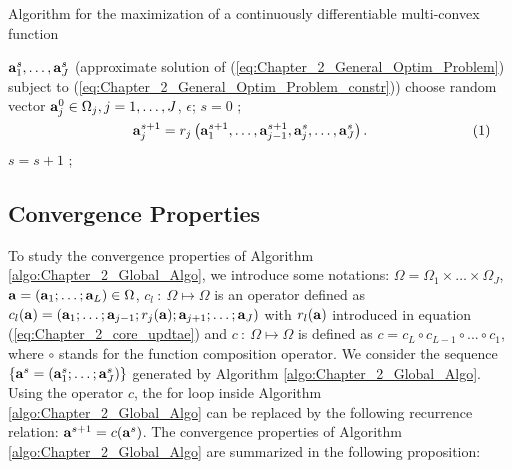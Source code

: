 \documentclass[
]{jss}
\begin{document}
\begin{algorithm}[!ht]
    \caption{Algorithm for the maximization of a continuously differentiable multi-convex function}
    \begin{algorithmic}[1]
         {$\mathbf{a}_1^s, \ldots, \mathbf{a}_J^s$ (approximate solution of (\ref{eq:Chapter_2_General_Optim_Problem}) subject to (\ref{eq:Chapter_2_General_Optim_Problem_constr}))}
         {choose random vector $\mathbf{a}_j^0\in\Omega_j, j =1, \ldots, J$, $\epsilon$;}
        \STATE$s = 0$ ;
        \REPEAT
        \STATE \hspace{-2cm}$\vcenter{\begin{equation}
            \ma a_j^{s+1} = r_j\left( \ma a_1^{s+1}, \ldots, \ma a_{j-1}^{s+1}, \ma a_j^{s}, \ldots, \ma a_J^{s}\right).
        \end{equation}}$
        \ENDFOR
        \STATE$s = s + 1$ ;
    \end{algorithmic}
    \label{algo:Chapter_2_Global_Algo}
\end{algorithm}

\hypertarget{convergence-properties}{%
\subsection{Convergence Properties}\label{convergence-properties}}

To study the convergence properties of Algorithm\\
\ref{algo:Chapter_2_Global_Algo}, we introduce some notations:
\(\Omega = \Omega_1 \times \ldots \times \Omega_J\),
\(\mathbf{a} = \left(\mathbf{a}_1; \ldots;\mathbf{a}_L\right) \in \Omega\),
\(c_l~:~\Omega\mapsto\Omega\) is an operator defined as
\(c_l(\mathbf{a}) = \left(\mathbf{a}_1; \ldots; \mathbf{a}_{j-1} ; r_j(\mathbf{a}) ; \mathbf{a}_{j+1} ; \ldots; \mathbf{a}_J\right)\)
with \(r_l(\mathbf{a})\) introduced in equation
(\ref{eq:Chapter_2_core_updtae}) and \(c~:~\Omega\mapsto\Omega\) is
defined as \(c = c_L\circ c_{L-1}\circ ... \circ c_1\), where \(\circ\)
stands for the function composition operator. We consider the sequence
\(\left\lbrace \mathbf{a}^s = \left(\mathbf{a}_1^{s}; \ldots; \mathbf{a}_J^{s} \right) \right\rbrace\)
generated by Algorithm \ref{algo:Chapter_2_Global_Algo}. Using the
operator \(c\), the \guillemotleft for loop\guillemotright{} inside
Algorithm \ref{algo:Chapter_2_Global_Algo} can be replaced by the
following recurrence relation: \(\mathbf{a}^{s+1} = c(\mathbf{a}^s)\). The
convergence properties of Algorithm \ref{algo:Chapter_2_Global_Algo} are
summarized in the following proposition:
\end{document}
